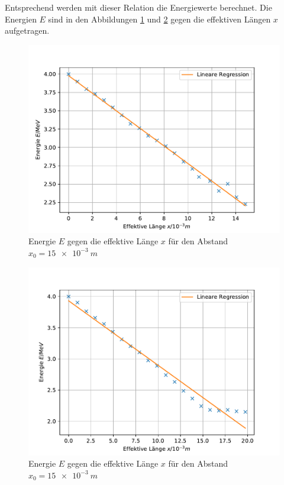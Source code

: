 Entsprechend werden mit dieser Relation die Energiewerte berechnet.
Die Energien $E$ sind in den Abbildungen \ref{fig:e15} und \ref{fig:e20} gegen die effektiven Längen $x$ aufgetragen.
\begin{figure}[h!]
  \centering
  \includegraphics[width=\textwidth]{e15.pdf}
  \caption{Energie $E$ gegen die effektive Länge $x$ für den Abstand $x_{\text{0}}=\SI{15e-3}{m}$}
  \label{fig:e15}
\end{figure}
\begin{figure}[h!]
  \centering
  \includegraphics[width=\textwidth]{e20.pdf}
  \caption{Energie $E$ gegen die effektive Länge $x$ für den Abstand $x_{\text{0}}=\SI{15e-3}{m}$}
  \label{fig:e20}
\end{figure}
